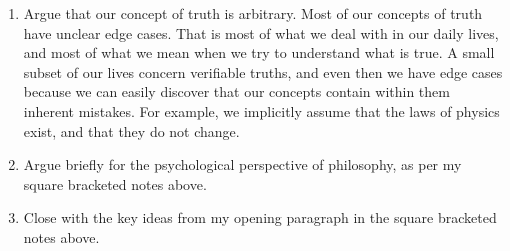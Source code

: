 \documentclass[11pt, oneside]{article}   	%
\begin{document}
\begin{enumerate}
    \item Argue that our concept of truth is arbitrary. Most of our concepts of
        truth have unclear edge cases. That is most of what we deal with in our
        daily lives, and most of what we mean when we try to understand what is
        true. A small subset of our lives concern verifiable truths, and even
        then we have edge cases because we can easily discover that our concepts
        contain within them inherent mistakes. For example, we implicitly assume
        that the laws of physics exist, and that they do not change.
    \item Argue briefly for the psychological perspective of philosophy, as per
        my square bracketed notes above.
    \item Close with the key ideas from my opening paragraph in the square
        bracketed notes above.
\end{enumerate}
\end{document}
